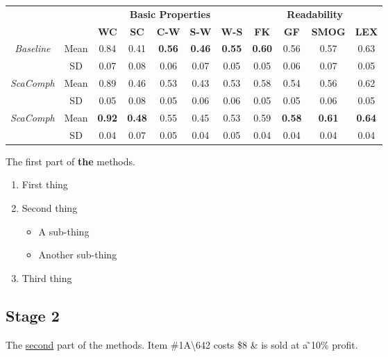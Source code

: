 \documentclass[a4paper, 10pt, fullpage]{article}
\begin{document}
\renewcommand{\arraystretch}{1}
\begin{center}
\begin{tabular}{|cc|c|c|c|c|c|c|c|c|c|c|}
	\cline{4-12}
	& & & \multicolumn{5}{c}{\textbf{Basic Properties}} & \multicolumn{4}{c}{\textbf{Readability}} \\
	\cline{4-12}
	& & & \textbf{WC} & \textbf{SC} & \textbf{C-W} & \textbf{S-W} & \textbf{W-S} & \textbf{FK} & \textbf{GF} & \textbf{SMOG} & \textbf{LEX} \\
	\hline
	\multicolumn{2}{c}{\multirow{2}{*}{\textit{Baseline}}} & Mean & 0.84 & 0.41 & \textbf{0.56} & \textbf{0.46} & \textbf{0.55} & \textbf{0.60} & 0.56 & 0.57 & 0.63 \\
	\cline{3-12}
	\multicolumn{2}{c}{} & SD & 0.07 & 0.08 & 0.06 & 0.07 & 0.05 & 0.05 & 0.06 & 0.07 & 0.05 \\
	\hline
	\hline
	\multicolumn{2}{c}{\multirow{2}{*}{\textit{ScaComph}}} & Mean & 0.89 & 0.46 & 0.53 & 0.43 & 0.53 & 0.58 & 0.54 & 0.56 & 0.62 \\
	\cline{3-12}
	\multicolumn{2}{c}{} & SD & 0.05 & 0.08 & 0.05 & 0.06 & 0.06 & 0.05 & 0.05 & 0.06 & 0.05 \\
	\hline
	\hline
	\multicolumn{2}{c}{\multirow{2}{*}{\textit{ScaComph}}} & Mean & \textbf{0.92} & \textbf{0.48} & 0.55 & 0.45 & 0.53 & 0.59 & \textbf{0.58} & \textbf{0.61} & \textbf{0.64} \\
	\cline{3-12}
	\multicolumn{2}{c}{} & SD & 0.04 & 0.07 & 0.05 & 0.04 & 0.05 & 0.04 & 0.04 & 0.04 & 0.04 \\
	\hline
	
		
\end{tabular}
\end{center}

\break
The first {\color{red}part} of \textbf{the} methods.
\begin{enumerate}
\item First thing 
\item Second thing 
\begin{itemize}
\item A sub-thing
\item Another sub-thing 
\end{itemize}
\item Third thing
\end{enumerate}

\subsection{Stage 2}
The \underline{second} part of the {\tiny methods}.
Item \#1A\textbackslash 642 costs \$8 \& is sold at a  ̃10\% profit.
\end{document}
